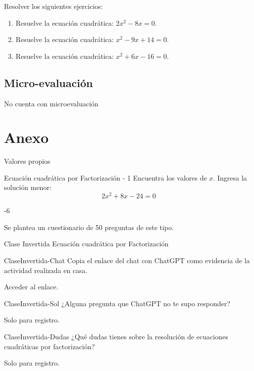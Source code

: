 \documentclass[a4,11pt]{aleph-notas}
\begin{document}
Resolver los siguientes ejercicios:

\begin{enumerate}
    \item Resuelve la ecuación cuadrática: $2x^2 - 8x = 0$.
    \item Resuelve la ecuación cuadrática: $x^2 - 9x + 14 = 0$.
    \item Resuelve la ecuación cuadrática: $x^2 + 6x - 16 = 0$.
\end{enumerate}

\subsection{Micro-evaluación}

No cuenta con microevaluación

\section{Anexo}

\begin{quiz}{Valores propios}

\begin{numerical}[]%
    {Ecuación cuadrática por Factorización - 1}
    Encuentra los valores de $x$. Ingresa la solución menor:
    \[
        2 x^{2} + 8 x - 24 = 0
    \]
    \item[] -6
\end{numerical}

\end{quiz}

Se plantea un cuestionario de 50 preguntas de este tipo.

\begin{quiz}{Clase Invertida Ecuación cuadrática por Factorización}
    
\begin{essay}[response format=text, response field lines=5]%
    {ClaseInvertida-Chat}
    Copia el enlace del chat con ChatGPT como evidencia de la actividad realizada en casa.
    \item Acceder al enlace.
\end{essay}

\begin{essay}[response format=text, response field lines=5]%
    {ClaseInvertida-Sol}
    ¿Alguna pregunta que ChatGPT no te supo responder?
    \item Solo para registro.
\end{essay}

\begin{essay}[response format=text, response field lines=5]%
    {ClaseInvertida-Dudas}
    ¿Qué dudas tienes sobre la resolución de ecuaciones cuadráticas por factorización?
    \item Solo para registro.
\end{essay}



\end{quiz}
\end{document}
